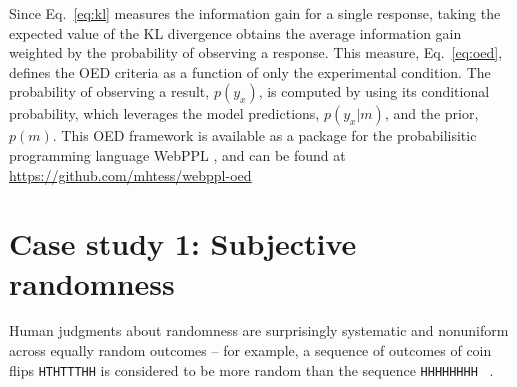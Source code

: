 \documentclass{article}
\newcommand{\ndg}[1]{\textcolor{Green}{[ndg: #1]}}
\newcommand{\argmax}{\operatornamewithlimits{argmax}}
\begin{document}
Since Eq.~\ref{eq:kl} measures the information gain for a single response, taking the expected value of the KL divergence obtains the average information gain weighted by the probability of observing a response. This measure, Eq.~\ref{eq:oed}, defines the OED criteria as a function of only the experimental condition. The probability of observing a result, $p(y_x)$, is computed by using its conditional probability, which leverages the model predictions, $p(y_x|m)$, and the prior, $p(m)$.
This OED framework is available as a package for the probabilisitic programming language WebPPL \cite{dippl}, and can be found at \url{https://github.com/mhtess/webppl-oed}

\section{Case study 1: Subjective randomness}
\label{s:tutorial}

Human judgments about randomness are surprisingly systematic and nonuniform across equally random outcomes -- for example, a sequence of outcomes of coin flips \lstinline{HTHTTTHH} is considered to be more random than the sequence \lstinline{HHHHHHHH} ~\cite{goodfellow38:jep, griffiths01:cogsci}.
\end{document}
